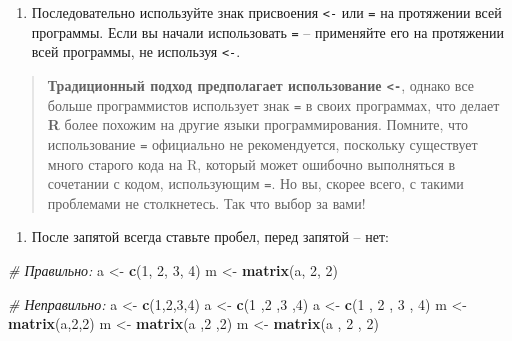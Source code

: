 \documentclass[]{book}
\newenvironment{Shaded}{\begin{snugshade}}{\end{snugshade}}
\newcommand{\KeywordTok}[1]{\textcolor[rgb]{0.13,0.29,0.53}{\textbf{#1}}}
\newcommand{\DecValTok}[1]{\textcolor[rgb]{0.00,0.00,0.81}{#1}}
\newcommand{\StringTok}[1]{\textcolor[rgb]{0.31,0.60,0.02}{#1}}
\newcommand{\CommentTok}[1]{\textcolor[rgb]{0.56,0.35,0.01}{\textit{#1}}}
\newcommand{\NormalTok}[1]{#1}
\providecommand{\tightlist}{%
  \setlength{\itemsep}{0pt}\setlength{\parskip}{0pt}}
\begin{document}
\begin{enumerate}
\def\labelenumi{\arabic{enumi}.}
\tightlist
\item
  Последовательно используйте знак присвоения \texttt{\textless{}-} или
  \texttt{=} на протяжении всей программы. Если вы начали использовать
  \texttt{=} -- применяйте его на протяжении всей программы, не
  используя \texttt{\textless{}-}.
\end{enumerate}

\begin{quote}
\textbf{Традиционный подход предполагает использование
\texttt{\textless{}-}}, однако все больше программистов использует знак
\texttt{=} в своих программах, что делает \textbf{R} более похожим на
другие языки программирования. Помните, что использование \texttt{=}
официально не рекомендуется, поскольку существует много старого кода на
R, который может ошибочно выполняться в сочетании с кодом, использующим
\texttt{=}. Но вы, скорее всего, с такими проблемами не столкнетесь. Так
что выбор за вами!
\end{quote}

\begin{enumerate}
\def\labelenumi{\arabic{enumi}.}
\setcounter{enumi}{1}
\tightlist
\item
  После запятой всегда ставьте пробел, перед запятой -- нет:
\end{enumerate}

\begin{Shaded}
\begin{Highlighting}[]
\CommentTok{# Правильно:}
\NormalTok{a <-}\StringTok{ }\KeywordTok{c}\NormalTok{(}\DecValTok{1}\NormalTok{, }\DecValTok{2}\NormalTok{, }\DecValTok{3}\NormalTok{, }\DecValTok{4}\NormalTok{)}
\NormalTok{m <-}\StringTok{ }\KeywordTok{matrix}\NormalTok{(a, }\DecValTok{2}\NormalTok{, }\DecValTok{2}\NormalTok{)}

\CommentTok{# Неправильно:}
\NormalTok{a <-}\StringTok{ }\KeywordTok{c}\NormalTok{(}\DecValTok{1}\NormalTok{,}\DecValTok{2}\NormalTok{,}\DecValTok{3}\NormalTok{,}\DecValTok{4}\NormalTok{)}
\NormalTok{a <-}\StringTok{ }\KeywordTok{c}\NormalTok{(}\DecValTok{1}\NormalTok{ ,}\DecValTok{2}\NormalTok{ ,}\DecValTok{3}\NormalTok{ ,}\DecValTok{4}\NormalTok{)}
\NormalTok{a <-}\StringTok{ }\KeywordTok{c}\NormalTok{(}\DecValTok{1}\NormalTok{ , }\DecValTok{2}\NormalTok{ , }\DecValTok{3}\NormalTok{ , }\DecValTok{4}\NormalTok{)}
\NormalTok{m <-}\StringTok{ }\KeywordTok{matrix}\NormalTok{(a,}\DecValTok{2}\NormalTok{,}\DecValTok{2}\NormalTok{)}
\NormalTok{m <-}\StringTok{ }\KeywordTok{matrix}\NormalTok{(a ,}\DecValTok{2}\NormalTok{ ,}\DecValTok{2}\NormalTok{)}
\NormalTok{m <-}\StringTok{ }\KeywordTok{matrix}\NormalTok{(a , }\DecValTok{2}\NormalTok{ , }\DecValTok{2}\NormalTok{)}
\end{Highlighting}
\end{Shaded}
\end{document}
